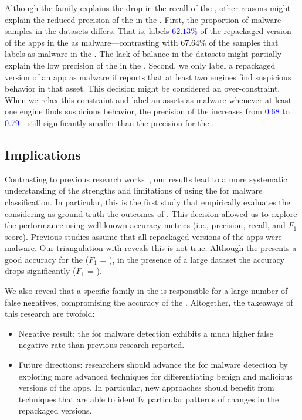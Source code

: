 Although the \gps family explains the drop in the recall of the \mas, other  reasons might explain the reduced precision of the \mas in the \cds. First, the proportion of malware samples in the
datasets differs. That is, \vt labels \textcolor{blue}{$62.13$\%} of the repackaged version of the apps in the \cds as malware---contrasting with 67.64\% of the samples that \vt labels as malware in the \sds. The lack of balance in the datasets might partially explain the low precision of the \mas in the \cds. Second, we only label a repackaged version of an app as malware if \vt reports that at least two engines find suspicious behavior in that asset. This decision might be considered an over-constraint. When we relax this constraint and label an assets as malware whenever at least one engine finds suspicious behavior, the precision of the \mas increases from \textcolor{blue}{0.68} to \textcolor{blue}{0.79}---still significantly smaller than the \mas precision for the \sds.

\subsection{Implications}\label{sec:implications} 

Contrasting to previous research works~\cite{DBLP:conf/wcre/BaoLL18,DBLP:conf/iceccs/LeB0GL18,DBLP:journals/jss/CostaMMSSBNR22},
our results 
lead to a more systematic understanding
of the strengths and limitations of using the \mas
for malware classification. In particular, this is the
first study that empirically evaluates the \mas
considering as ground truth the outcomes
of \vt. This decision allowed us to explore the
\mas performance using well-known accuracy metrics (i.e., precision, recall, and
$F_1$ score). Previous studies assume that all repackaged versions of the
apps were malware. Our triangulation with \vt reveals this is not true. Although
the \mas presents a good accuracy for the \sds ($F_1$ = \fscoreSmall), 
in the presence of a large dataset the \mas accuracy drops significantly ($F_1$ = \fscore). 

We also reveal that a specific family in the \cds is responsible for a large number of false negatives,
compromising the accuracy of the \mas.
Altogether, the takeaways of this research are twofold:

\begin{itemize}
  \item Negative result: the \mas for malware detection exhibits a much higher false negative rate than previous research reported. 

  \item Future directions: researchers should advance the \mas for malware detection by exploring more advanced
    techniques for differentiating benign and malicious versions of the apps. In particular, new approaches should benefit from techniques
    that are able to identify particular patterns of changes in the repackaged versions. 
\end{itemize}  


